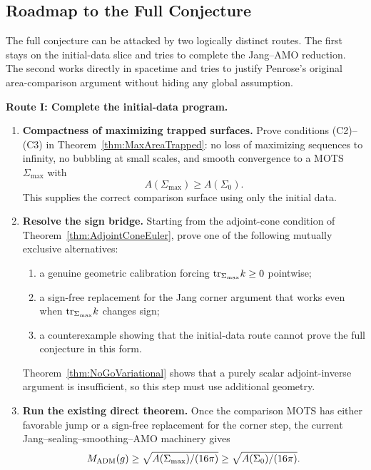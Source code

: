 \subsection{Roadmap to the Full Conjecture}

The full conjecture can be attacked by two logically distinct routes. The first stays on the initial-data slice and tries to complete the Jang--AMO reduction. The second works directly in spacetime and tries to justify Penrose's original area-comparison argument without hiding any global assumption.

\textbf{Route I: Complete the initial-data program.}
\begin{enumerate}
    \item \textbf{Compactness of maximizing trapped surfaces.} Prove conditions (C2)--(C3) in Theorem~\ref{thm:MaxAreaTrapped}: no loss of maximizing sequences to infinity, no bubbling at small scales, and smooth convergence to a MOTS $\Sigma_{\max}$ with
    \[
        A(\Sigma_{\max})\ge A(\Sigma_0).
    \]
    This supplies the correct comparison surface using only the initial data.

    \item \textbf{Resolve the sign bridge.} Starting from the adjoint-cone condition of Theorem~\ref{thm:AdjointConeEuler}, prove one of the following mutually exclusive alternatives:
    \begin{enumerate}
        \item a genuine geometric calibration forcing $\mathrm{tr}_{\Sigma_{\max}}k\ge0$ pointwise;
        \item a sign-free replacement for the Jang corner argument that works even when $\mathrm{tr}_{\Sigma_{\max}}k$ changes sign;
        \item a counterexample showing that the initial-data route cannot prove the full conjecture in this form.
    \end{enumerate}
    Theorem~\ref{thm:NoGoVariational} shows that a purely scalar adjoint-inverse argument is insufficient, so this step must use additional geometry.

    \item \textbf{Run the existing direct theorem.} Once the comparison MOTS has either favorable jump or a sign-free replacement for the corner step, the current Jang--sealing--smoothing--AMO machinery gives
    \[
        M_{\mathrm{ADM}}(g)\ge \sqrt{A(\Sigma_{\max})/(16\pi)}
        \ge \sqrt{A(\Sigma_0)/(16\pi)}.
    \]


\end{enumerate}
